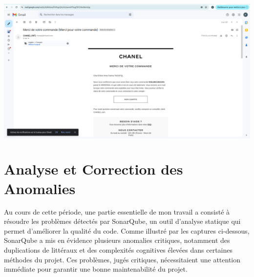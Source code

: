 \begin{center}
    \centering
    \includegraphics[width=19cm]{Figures/Screens/confirmation par mail.png}
    \label{fig:email}
\end{center}
\section{Analyse et Correction des Anomalies}

Au cours de cette période, une partie essentielle de mon travail a consisté à résoudre les problèmes détectés par SonarQube, un outil d'analyse statique qui permet d'améliorer la qualité du code. Comme illustré par les captures ci-dessous, SonarQube a mis en évidence plusieurs anomalies critiques, notamment des  duplications de littéraux  et des  complexités cognitives  élevées dans certaines méthodes du projet. Ces problèmes, jugés critiques, nécessitaient une attention immédiate pour garantir une bonne maintenabilité du projet.

